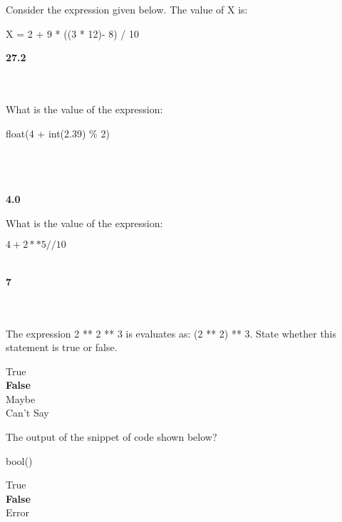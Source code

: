 \documentclass{exam}
\begin{document}
\begin{questions}
     \question Consider the expression given below. The value of X is:

            X = 2 + 9 * ((3 * 12)- 8) / 10

     \begin{oneparchoices}
         \choice \textbf{27.2}\\
         \\
         \\
     \end{oneparchoices}

     \question What is the value of the expression:

            float(4 + int(2.39) \% 2)

     \begin{oneparchoices}
          \\
          \\
          \\
         \choice \textbf{4.0}
     \end{oneparchoices}

     \question What is the value of the expression:

            $4 + 2 ** 5 // 10$

     \begin{oneparchoices}
          \\
         \choice \textbf{7} \\
          \\
          \\
     \end{oneparchoices}

     \question The expression 2 ** 2 ** 3 is evaluates as: (2 ** 2) ** 3. State whether this statement is true or false.

     \begin{oneparchoices}
         \choice True \\
         \choice \textbf{False} \\
         \choice Maybe \\
         \choice Can't Say
     \end{oneparchoices}

     \question The output of the snippet of code shown below?

            bool()
     \begin{oneparchoices}
         \choice True \\
         \choice \textbf{False} \\
         \choice Error
     \end{oneparchoices}


\end{questions}
\end{document}
